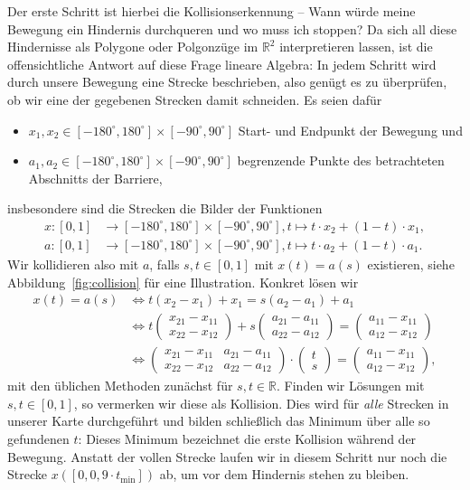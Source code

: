 \documentclass[
    paper=a4,
    DIV14,
    fontsize=12pt,
    pagesize=pdftex,
    toc=bibliographynumbered
]{scrartcl}
\numberwithin{figure}{section}
\numberwithin{equation}{section}
\numberwithin{table}{section}
\newcommand*\setR{\mathds{R}}
\newcommand*\vecz[2]{\begin{pmatrix} #1 \\ #2 \end{pmatrix}}
\newcommand*\matDD[4]{\begin{pmatrix} #1 & #2 \\ #3 & #4 \end{pmatrix}}
\begin{document}
Der erste Schritt ist hierbei die Kollisionserkennung -- Wann würde meine Bewegung ein
Hindernis durchqueren und wo muss ich stoppen? Da sich all diese Hindernisse als Polygone
oder Polgonzüge im $\setR^2$ interpretieren lassen, ist die offensichtliche Antwort auf
diese Frage lineare Algebra: In jedem Schritt wird durch unsere Bewegung eine Strecke
beschrieben, also genügt es zu überprüfen, ob wir eine der gegebenen Strecken damit
schneiden. Es seien dafür
\begin{itemize}
    \item $x_1, x_2 \in [-180^\circ, 180^\circ]\times[-90^\circ, 90^\circ]$ Start- und
        Endpunkt der Bewegung und
    \item $a_1, a_2 \in [-180^\circ, 180^\circ]\times[-90^\circ, 90^\circ]$ begrenzende
        Punkte des betrachteten Abschnitts der Barriere,
\end{itemize}
insbesondere sind die Strecken die Bilder der Funktionen
\begin{align*}
    x:[0,1] &\to [-180^\circ, 180^\circ]\times[-90^\circ, 90^\circ],
    t \mapsto t\cdot x_2 + (1-t) \cdot x_1, \\
    a:[0,1] &\to [-180^\circ, 180^\circ]\times[-90^\circ, 90^\circ],
    t \mapsto t \cdot a_2 + (1-t) \cdot a_1.
\end{align*}
Wir kollidieren also mit $a$, falls $s,t \in [0,1]$ mit $x(t) = a(s)$ existieren, siehe
Abbildung~\ref{fig:collision} für eine Illustration. Konkret lösen wir
\begin{align*}
    x(t) = a(s) &\iff
    t(x_2 - x_1) + x_1 = s(a_2 - a_1) + a_1 \\
    &\iff
    t\vecz{x_{21}-x_{11}}{x_{22}-x_{12}}+s\vecz{a_{21}-a_{11}}{a_{22}- a_{12}}
    =\vecz{a_{11}-x_{11}}{a_{12}-x_{12}} \\
    &\iff
    \matDD{x_{21}-x_{11}}{a_{21}-a_{11}}{x_{22}-x_{12}}{a_{22}- a_{12}} \cdot
    \vecz ts =\vecz{a_{11}-x_{11}}{a_{12}-x_{12}},
\end{align*}
mit den üblichen Methoden zunächst für $s,t\in\setR$. Finden wir Lösungen mit
$s,t\in[0,1]$, so vermerken wir diese als Kollision. Dies wird für \emph{alle} Strecken in
unserer Karte durchgeführt und bilden schließlich das Minimum über alle so gefundenen
$t$: Dieses Minimum bezeichnet die erste Kollision während der Bewegung. Anstatt der
vollen Strecke laufen wir in diesem Schritt nur noch die Strecke $x([0, 0{,}9\cdot
t_{\min}])$ ab, um vor dem Hindernis stehen zu bleiben.
\end{document}
